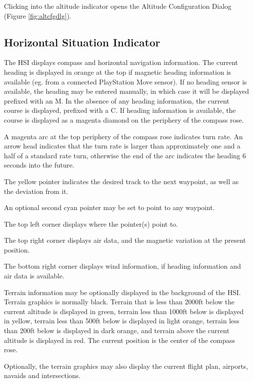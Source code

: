 \documentclass[a4paper,10pt,pdftex]{article}
\begin{document}
Clicking into the altitude indicator opens the Altitude Configuration
Dialog (Figure \ref{fig:altcfgdlg}).

\subsection{Horizontal Situation Indicator}

The HSI displays compass and horizontal navigation information. The
current heading is displayed in orange at the top if magnetic heading
information is available (eg. from a connected PlayStation Move
sensor). If no heading sensor is available, the heading may be entered
manually, in which case it will be displayed prefixed with an M. In
the absence of any heading information, the current course is
displayed, prefixed with a C. If heading information is available, the
course is displayed as a magenta diamond on the periphery of the
compass rose.

A magenta arc at the top periphery of the compass rose indicates turn
rate. An arrow head indicates that the turn rate is larger than
approximately one and a half of a standard rate turn, otherwise the
end of the arc indicates the heading 6 seconds into the future.

The yellow pointer indicates the desired track to the next waypoint,
as well as the deviation from it.

An optional second cyan pointer may be set to point to any waypoint.

The top left corner displays where the pointer(s) point to.

The top right corner displays air data, and the magnetic variation at
the present position.

The bottom right corner displays wind information, if heading
information and air data is available.

Terrain information may be optionally displayed in the background of
the HSI. Terrain graphics is normally black. Terrain that is less than
2000ft below the current altitude is displayed in green, terrain less
than 1000ft below is displayed in yellow, terrain less than 500ft
below is displayed in light orange, terrain less than 200ft below is
displayed in dark orange, and terrain above the current altitude is
displayed in red. The current position is the center of the compass
rose.

Optionally, the terrain graphics may also display the current flight
plan, airports, navaids and intersections.
\end{document}
